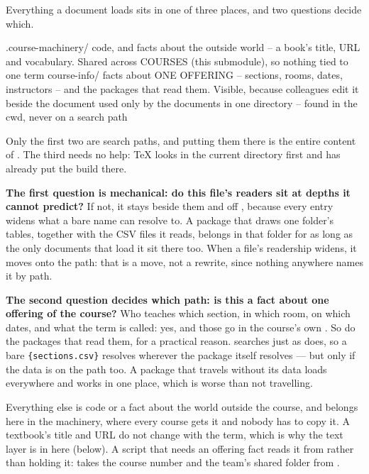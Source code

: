 Everything a document loads sits in one of three places, and two questions
decide which.

\begin{manexsource}
.course-machinery/   code, and facts about the outside world -- a book's
                     title, URL and vocabulary. Shared across COURSES
                     (this submodule), so nothing tied to one term
course-info/         facts about ONE OFFERING -- sections, rooms, dates,
                     instructors -- and the packages that read them.
                     Visible, because colleagues edit it
beside the document  used only by the documents in one directory --
                     found in the cwd, never on a search path
\end{manexsource}

Only the first two are search paths, and putting them there is the entire
content of . The third needs no help: TeX looks in the
current directory first and  has already put the build
there.

\textbf{The first question is mechanical: do this file's readers sit at
depths it cannot predict?}
If not, it stays beside them and off , because every entry widens what a bare name can resolve to.
A package that draws one folder's tables, together with the CSV files it reads, belongs in that folder for as long as the only documents that load it sit there too.
When a file's readership widens, it moves onto the path: that is a move, not a rewrite, since nothing anywhere names it by path.

\textbf{The second question decides which path: is this a fact about one
offering of the course?}
Who teaches which section, in which room, on which dates, and what the term is called: yes, and those go in the course's own .
So do the packages that read them, for a practical reason.
 searches  just as  does, so a bare \texttt{\{sections.csv\}} resolves wherever the package itself resolves --- but only if the data is on the path too.
A package that travels without its data loads everywhere and works in one place, which is worse than not travelling.

Everything else is code or a fact about the world outside the course, and belongs here in the machinery, where every course gets it and nobody has to copy it.
A textbook's title and URL do not change with the term, which is why the text layer is in  here (below).
A script that needs an offering fact reads it from  rather than holding it:  takes the course number and the team's shared folder from .

